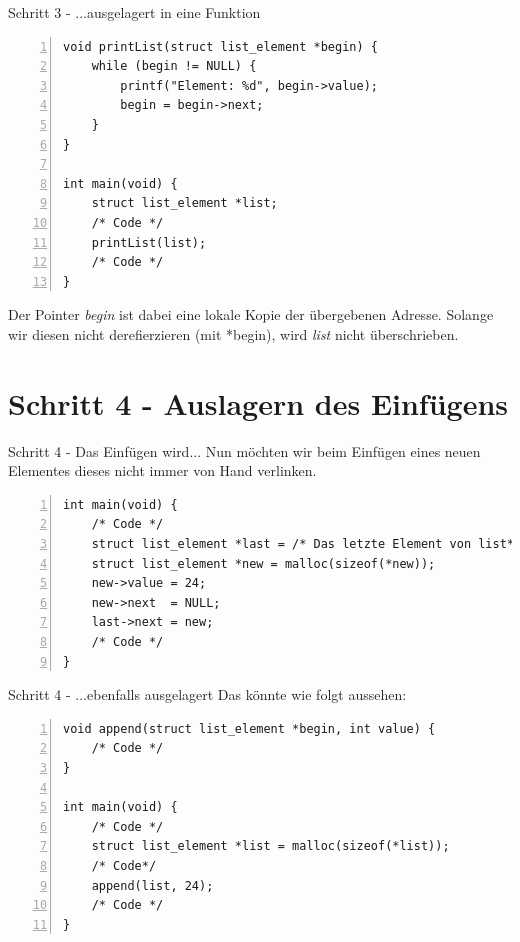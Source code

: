 
\begin{frame}[fragile]{Schritt 3 - ...ausgelagert in eine Funktion}
\begin{lstlisting}[numbers=left]
void printList(struct list_element *begin) {
    while (begin != NULL) {
        printf("Element: %d", begin->value);
        begin = begin->next;
    }
}

int main(void) {
    struct list_element *list;
    /* Code */
    printList(list);
    /* Code */
}
\end{lstlisting}
Der Pointer \textit{begin} ist dabei eine lokale Kopie der übergebenen Adresse. Solange wir diesen nicht derefierzieren (mit *begin), wird \textit{list} nicht überschrieben.
\end{frame}
 
\section{Schritt 4 - Auslagern des Einfügens}

\begin{frame}[fragile]{Schritt 4 - Das Einfügen wird...}
Nun möchten wir beim Einfügen eines neuen Elementes dieses nicht immer von Hand verlinken.
\begin{lstlisting}[numbers=left]
int main(void) {
    /* Code */
    struct list_element *last = /* Das letzte Element von list*/;
    struct list_element *new = malloc(sizeof(*new));
    new->value = 24;
    new->next  = NULL;
    last->next = new;
    /* Code */
}
\end{lstlisting}
\end{frame}
 
\begin{frame}[fragile]{Schritt 4 - ...ebenfalls ausgelagert}
Das könnte wie folgt aussehen:
\begin{lstlisting}[numbers=left]
void append(struct list_element *begin, int value) {
    /* Code */
}

int main(void) {
    /* Code */
    struct list_element *list = malloc(sizeof(*list));
    /* Code*/
    append(list, 24);
    /* Code */
}
\end{lstlisting}
\end{frame}
 
